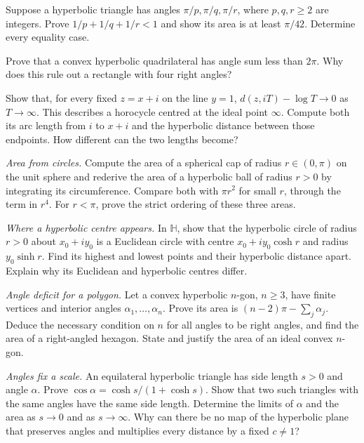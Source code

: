 \begin{exercise}[$\star$]\label{geometry:ex:tilings}
Suppose a hyperbolic triangle has angles $\pi/p,\pi/q,\pi/r$, where
$p,q,r\ge2$ are integers. Prove $1/p+1/q+1/r<1$ and show its area is
at least $\pi/42$. Determine every equality case.
\end{exercise}
\begin{exercise}[$\star\star$]\label{geometry:ex:quadrilateral}
Prove that a convex hyperbolic quadrilateral has angle sum less than $2\pi$.
Why does this rule out a rectangle with four right angles?
\end{exercise}
\begin{exercise}[$\star\star\star$]\label{geometry:ex:horocycle}
Show that, for every fixed $z=x+i$ on the line $y=1$,
$d(z,iT)-\log T\to0$ as $T\to\infty$.
This describes a horocycle centred at the ideal point $\infty$.
Compute both its arc length from $i$ to $x+i$ and the hyperbolic distance
between those endpoints. How different can the two lengths become?
\end{exercise}

\begin{exercise}[$\star\star$]\label{geometry:ex:v9-caps-and-balls}
\emph{Area from circles.} Compute the area of a spherical cap of radius
$r\in(0,\pi)$ on the unit sphere and rederive the area of a hyperbolic
ball of radius $r>0$ by integrating its circumference.
Compare both with $\pi r^2$ for small $r$, through the term in $r^4$.
For $r<\pi$, prove the strict ordering of these three areas.
\end{exercise}
\begin{exercise}[$\star\star$]\label{geometry:ex:v9-offset-circle}
\emph{Where a hyperbolic centre appears.} In $\mathbb H$, show that the
hyperbolic circle of radius $r>0$ about $x_0+iy_0$ is a Euclidean circle
with centre $x_0+iy_0\cosh r$ and radius $y_0\sinh r$.
Find its highest and lowest points and their hyperbolic distance apart.
Explain why its Euclidean and hyperbolic centres differ.
\end{exercise}
\begin{exercise}[$\star\star$]\label{geometry:ex:v9-hyperbolic-polygons}
\emph{Angle deficit for a polygon.} Let a convex hyperbolic $n$-gon,
$n\ge3$, have finite vertices and interior angles $\alpha_1,\ldots,\alpha_n$.
Prove its area is $(n-2)\pi-\sum_j\alpha_j$.
Deduce the necessary condition on $n$ for all angles to be right angles,
and find the area of a right-angled hexagon.
State and justify the area of an ideal convex $n$-gon.
\end{exercise}
\begin{exercise}[$\star\star$]\label{geometry:ex:v9-rigid-equilateral}
\emph{Angles fix a scale.} An equilateral hyperbolic triangle has side
length $s>0$ and angle $\alpha$. Prove
$\cos\alpha=\cosh s/(1+\cosh s)$.
Show that two such triangles with the same angles have the same side
length. Determine the limits of $\alpha$ and the area as $s\to0$ and
as $s\to\infty$. Why can there be no map of the hyperbolic plane that
preserves angles and multiplies every distance by a fixed $c\ne1$?
\end{exercise}

